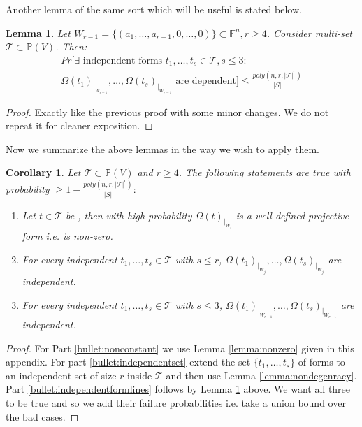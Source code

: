 \documentclass[12pt]{caltech_thesis}
\theoremstyle{plain}
\newtheorem{corollary}{Corollary}
\newtheorem{lemma}{Lemma}
\theoremstyle{definition}
\newcommand{\F}{\mathbb{F}}
\newcommand{\MT}{\mathcal{T}}
\newcommand{\PP}{\mathbb{P}}
\begin{document}
Another lemma of the same sort which will be useful is stated below.

\begin{lemma}\label{lemma:formsandlines}
Let $W_{r-1} = \{(a_1,\ldots,a_{r-1},0,\ldots,0)\}\subset \F^n, r\geq 4$. Consider multi-set $\MT\subset \PP(V)$. Then:
\begin{multline}\nonumber
Pr[ \exists \text{ independent forms } t_1,\ldots,t_s  \in \MT, s\leq 3 : \\\Omega(t_1)_{|_{W_{r-1}}},\ldots,\Omega(t_s)_{|_{W_{r-1}}} 
\text{ are dependent}] \leq\frac{poly(n,r,|\MT|^r)}{|S|}
\end{multline}
\end{lemma}
\begin{proof}
Exactly like the previous proof with some minor changes. We do not repeat it for cleaner exposition.
\end{proof}




Now we summarize the above lemmas in the way we wish to apply them.  
\begin{corollary}\label{corr:nondegeneracy}
 Let $\MT \subset \PP(V)$ and $r\geq 4$. The following statements are true with probability $\geq 1-\frac{poly(n,r,|\MT|^r)}{|S|}:$
 \begin{enumerate}
 \item\label{bullet:nonconstant} Let $t \in \MT$ be  , then with high probability $\Omega(t)_{|_{W_i}}$ is a well defined projective form
 i.e. is non-zero.
 
 \item\label{bullet:independentset} For every independent 
 $t_1,\ldots,t_s \in \MT$ with $s\leq r$, $\Omega(t_1)_{|_{W_j}},\ldots,\Omega(t_s)_{|_{W_j}}$ are independent.
 \item \label{bullet:independentformlines}For every independent
 $t_1,\ldots,t_s \in \MT$ with $s\leq 3$, $\Omega(t_1)_{|_{W_{r-1}}},\ldots,\Omega(t_s)_{|_{W_{r-1}}}$ are independent. 
 \end{enumerate}
\end{corollary}

\begin{proof}For Part \ref{bullet:nonconstant} we use Lemma \ref{lemma:nonzero} given in this appendix. For part \ref{bullet:independentset}
 extend the set $\{t_1,\ldots,t_s\}$ of forms to an independent set of size $r$ inside $\MT$ and then use Lemma \ref{lemma:nondegenracy}. 
 Part \ref{bullet:independentformlines} follows by Lemma \ref{lemma:formsandlines} above. We want all three to be true and so we add their 
 failure probabilities i.e. take a union bound over the bad cases.
\end{proof}
\end{document}
